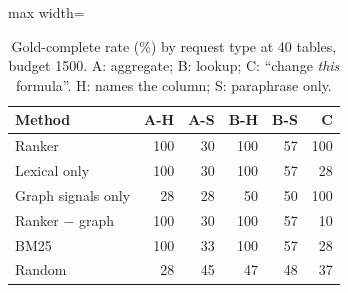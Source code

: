 \begin{table}
\caption{Gold-complete rate (\%) by request type at 40 tables, budget 1500. A: aggregate; B: lookup; C: ``change \emph{this} formula\textquotedblright{}. H: names the column; S: paraphrase only.}
\label{tab:e2-type}

\centering\footnotesize
\begin{adjustbox}{max width=\columnwidth}\begin{tabular}{l rrrrr}
\toprule
\textbf{Method} & A-H & A-S & B-H & B-S & C \\
\midrule
Ranker & 100 & 30 & 100 & 57 & 100 \\
Lexical only & 100 & 30 & 100 & 57 & 28 \\
Graph signals only & 28 & 28 & 50 & 50 & 100 \\
Ranker $-$ graph & 100 & 30 & 100 & 57 & 10 \\
BM25 & 100 & 33 & 100 & 57 & 28 \\
Random & 28 & 45 & 47 & 48 & 37 \\
\bottomrule
\end{tabular}\end{adjustbox}
\end{table}

